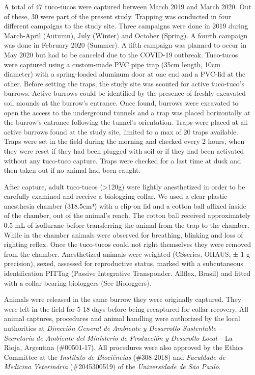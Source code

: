 \documentclass[msc,numbers,hidelinks]{coppe}
\begin{document}
  A total of 47 tuco-tucos were captured between March 2019 and March 2020. Out of these, 30 were part of the present study. Trapping was conducted in four different campaigns to the study site. Three campaigns were done in 2019 during March-April (Autumn), July (Winter) and October (Spring). A fourth campaign was done in February 2020 (Summer). A fifth campaign was planned to occur in May 2020 but had to be canceled due to the COVID-19 outbreak. Tuco-tucos were captured using a custom-made PVC pipe trap (35cm length, 10cm diameter) with a spring-loaded aluminum door at one end and a PVC-lid at the other. Before setting the traps, the study site was scouted for active tuco-tuco's burrows. Active burrows could be identified by the presence of freshly excavated soil mounds at the burrow's entrance. Once found, burrows were excavated to open the access to the underground tunnels and a trap was placed horizontally at the burrow's entrance following the tunnel's orientation. Traps were placed at all active burrows found at the study site, limited to a max of 20 traps available. Traps were set in the field during the morning and checked every 2 hours, when they were reset if they had been plugged with soil or if they had been activated without any tuco-tuco capture. Traps were checked for a last time at dusk and then taken out if no animal had been caught.

  After capture, adult tuco-tucos (\textgreater120g) were lightly anesthetized in order to be carefully examined and receive a biologging collar. We used a clear plastic anesthesia chamber (318.5cm³) with a clip-on lid and a cotton ball affixed inside of the chamber, out of the animal's reach. The cotton ball received approximately 0.5 mL of isoflurane before transferring the animal from the trap to the chamber. While in the chamber animals were observed for breathing, blinking and loss of righting reflex. Once the tuco-tucos could not right themselves they were removed from the chamber. Anesthetized animals were weighted (CSseries, OHAUS, ± 1 g precision), sexed, assessed for reproductive status, marked with a subcutaneous identification PITTag (Passive Integrative Transponder. Allflex, Brasil) and fitted with a collar bearing biologgers (See Biologgers).

  Animals were released in the same burrow they were originally captured. They were left in the field for 5-18 days before being recaptured for collar recovery. All animal captures, procedures and animal handling were authorized by the local authorities at \emph{Dirección General de Ambiente y Desarrollo Sustentable -- Secretaría de Ambiente del Ministerio de Producción y Desarollo Local} -- La Rioja, Argentina (\#00501-17). All procedures were also approved by the Ethics Committee at the \emph{Instituto de Biociências} (\#308-2018) and \emph{Faculdade de Medicina Veterinária} (\#2045300519) of the \emph{Universidade de São Paulo}.
\end{document}
